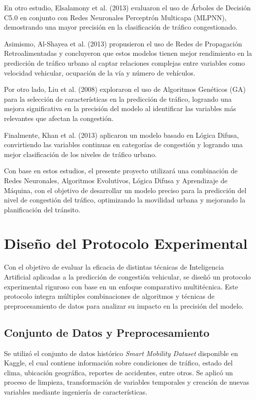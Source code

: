 \documentclass{svproc} %
\begin{document}
En otro estudio, Elsalamony et al. (2013) evaluaron el uso de Árboles de Decisión C5.0 en conjunto con Redes Neuronales
Perceptrón Multicapa (MLPNN), demostrando una mayor precisión en la clasificación de
tráfico congestionado.

Asimismo, Al-Shayea et al. (2013) propusieron el uso de Redes de Propagación
Retroalimentadas y concluyeron que estos modelos tienen mejor rendimiento en la
predicción de tráfico urbano al captar relaciones complejas entre variables como
velocidad vehicular, ocupación de la vía y número de vehículos.

Por otro lado, Liu et al. (2008) exploraron el uso de Algoritmos Genéticos (GA) para la
selección de características en la predicción de tráfico, logrando una mejora significativa
en la precisión del modelo al identificar las variables más relevantes que afectan la
congestión.

Finalmente, Khan et al. (2013) aplicaron un modelo basado en Lógica
Difusa, convirtiendo las variables continuas en categorías de congestión y logrando una
mejor clasificación de los niveles de tráfico urbano.

Con base en estos estudios, el presente proyecto utilizará una combinación de Redes
Neuronales, Algoritmos Evolutivos, Lógica Difusa y Aprendizaje de Máquina, con el
objetivo de desarrollar un modelo preciso para la predicción del nivel de congestión del
tráfico, optimizando la movilidad urbana y mejorando la planificación del tránsito.



\section{Diseño del Protocolo Experimental}

Con el objetivo de evaluar la eficacia de distintas técnicas de Inteligencia Artificial aplicadas a la predicción de congestión vehicular, se diseñó un protocolo experimental riguroso con base en un enfoque comparativo multitécnica. Este protocolo integra múltiples combinaciones de algoritmos y técnicas de preprocesamiento de datos para analizar su impacto en la precisión del modelo.

\subsection{Conjunto de Datos y Preprocesamiento}

Se utilizó el conjunto de datos histórico \textit{Smart Mobility Dataset} disponible en Kaggle, el cual contiene información sobre condiciones de tráfico, estado del clima, ubicación geográfica, reportes de accidentes, entre otros. Se aplicó un proceso de limpieza, transformación de variables temporales y creación de nuevas variables mediante ingeniería de características.
\end{document}
